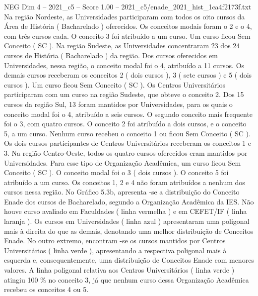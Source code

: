 \begin{textsample}{NEG Dim 4 – 2021\_c5 – Score 1.00 – 2021\_c5/enade\_2021\_hist\_1ca4f2173f.txt}
Na região Nordeste, as Universidades participaram com todos os oito cursos da Área de História ( Bacharelado ) oferecidos.
Os conceitos modais foram o 2 e o 4, com três cursos cada.
O conceito 3 foi atribuído a um curso.
Um curso ficou Sem Conceito ( SC ).
Na região Sudeste, as Universidades concentraram 23 dos 24 cursos de História ( Bacharelado ) da região.
Dos cursos oferecidos em Universidades, nessa região, o conceito modal foi o 4, atribuído a 11 cursos.
Os demais cursos receberam os conceitos 2 ( dois cursos ), 3 ( sete cursos ) e 5 ( dois cursos ).
Um curso ficou Sem Conceito ( SC ).
Os Centros Universitários participaram com um curso na região Sudeste, que obteve o conceito 2.
Dos 15 cursos da região Sul, 13 foram mantidos por Universidades, para os quais o conceito modal foi o 4, atribuído a seis cursos.
O segundo conceito mais frequente foi o 3, com quatro cursos.
O conceito 2 foi atribuído a dois cursos, e o conceito 5, a um curso.
Nenhum curso recebeu o conceito 1 ou ficou Sem Conceito ( SC ).
Os dois cursos participantes de Centros Universitários receberam os conceitos 1 e 3.
Na região Centro-Oeste, todos os quatro cursos oferecidos eram mantidos por Universidades.
Para esse tipo de Organização Acadêmica, um curso ficou Sem Conceito ( SC ).
O conceito modal foi o 3 ( dois cursos ).
O conceito 5 foi atribuído a um curso.
Os conceitos 1, 2 e 4 não foram atribuídos a nenhum dos cursos nessa região.
No Gráfico 5.3b, apresenta -se a distribuição do Conceito Enade dos cursos de Bacharelado, segundo a Organização Acadêmica da IES.
Não houve curso avaliado em Faculdades ( linha vermelha ) e em CEFET/IF ( linha laranja ).
Os cursos em Universidades ( linha azul ) apresentaram uma poligonal mais à direita do que as demais, denotando uma melhor distribuição de Conceitos Enade.
No outro extremo, encontram -se os cursos mantidos por Centros Universitários ( linha verde ), apresentando a respectiva poligonal mais à esquerda e, consequentemente, uma distribuição de Conceitos Enade com menores valores.
A linha poligonal relativa aos Centros Universitários ( linha verde ) atingiu 100 \% no conceito 3, já que nenhum curso dessa Organização Acadêmica recebeu os conceitos 4 ou 5.

\end{textsample}
